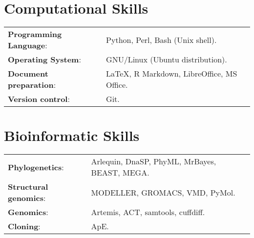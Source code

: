 \documentclass[margin,line]{res}
\begin{document}
\begin{resume}
\section{\sc Computational Skills}
\begin{tabular}{ l l}
	{\bf Programming Language}: & Python, Perl, Bash (Unix shell).\\
	{\bf Operating System}: & GNU/Linux (Ubuntu distribution).\\ %
	{\bf Document preparation}: & \LaTeX, R Markdown, LibreOffice, MS Office.\\ %
	{\bf Version control}: & Git.%
\end{tabular}

\section{\sc Bioinformatic Skills}
\begin{tabular}{l l}
	{\bf Phylogenetics}: & Arlequin, DnaSP, PhyML, MrBayes, BEAST, MEGA.\\
	{\bf Structural genomics}: & MODELLER, GROMACS, VMD, PyMol.\\
	{\bf Genomics}: & Artemis, ACT, samtools, cuffdiff.\\
	{\bf Cloning}: & ApE.%
\end{tabular}



\end{resume}
\end{document}
